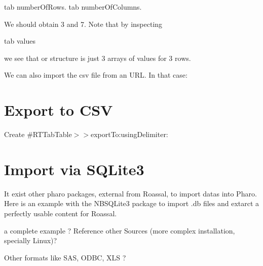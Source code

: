 \documentclass[a4paper,10pt,twoside]{book}
\begin{document}
\begin{code}{}
tab numberOfRows.
tab numberOfColumns.
\end{code}

We should obtain 3 and 7. Note that by inspecting

\begin{code}{}
tab values
\end{code}

we see that or structure is just 3 arrays of values for 3 rows.

We can also import the csv file from an URL. In that case:


\section{Export to CSV}
\begin{todo}

Create \#RTTabTable$>$$>$exportTo:usingDelimiter:
\end{todo}
\section{Import via SQLite3}
It exist other pharo packages, external from Roassal, to import datas into Pharo. Here is an example with the NBSQLite3 package to import .db files and extarct a perfectly usable content for Roassal.

\begin{todo}

a complete example ? Reference other Sources (more complex installation, specially Linux)?
\end{todo}

\begin{todo}

Other formats like SAS, ODBC, XLS ?
\end{todo}



\ifx\wholebook\relax\else
   
\end{document}
